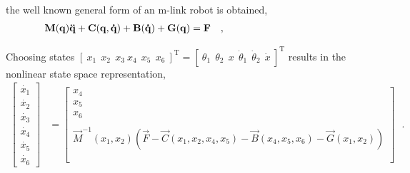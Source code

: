 the well known general form of an m-link robot is obtained, \cite{MWSpong, LSciavicco}
\begin{align}
\vec{M}(\vec{q})\vec{\ddot{q}} + \vec{C}(\vec{q},\vec{\dot{q}}) + \vec{B}(\vec{\dot{q}}) + \vec{G}(\vec{q}) &= \vec{F} \ \ \ , \hspace{3.3cm}
\end{align}
\begin{where}
                      {}
    {}
                            {}
                {}
          {}
\end{where}

Choosing states $ [\ x_1\ \ x_2\ \ x_3\ x_4\ \ x_5\ \ x_6\ ]^\mathrm{T} = [\ \theta_1\ \ \theta_2\ \ x\ \ \dot{\theta}_1\ \ \dot{\theta}_2\ \ \dot{x}\ ]^\mathrm{T} $ results in the nonlinear state space representation,
%
\begin{align}
  \begin{bmatrix}
    \dot{x_1} \\
    \dot{x_2} \\
    \dot{x_3} \\
    \dot{x_4} \\
    \dot{x_5} \\
    \dot{x_6}
  \end{bmatrix}
  &=
  \begin{bmatrix}
    x_4 \\
    x_5 \\
    x_6 \\
    \\
    \vec{M}^{-1}(x_1,x_2) ( \vec{F} - \vec{C}(x_1,x_2,x_4,x_5) - \vec{B}(x_4,x_5,x_6) - \vec{G}(x_1,x_2) ) \\
    \phantom{eq}
  \end{bmatrix}
  \label{eq:nonlinearStateSpaceTwin} \ \ \ . %
\end{align}
%















